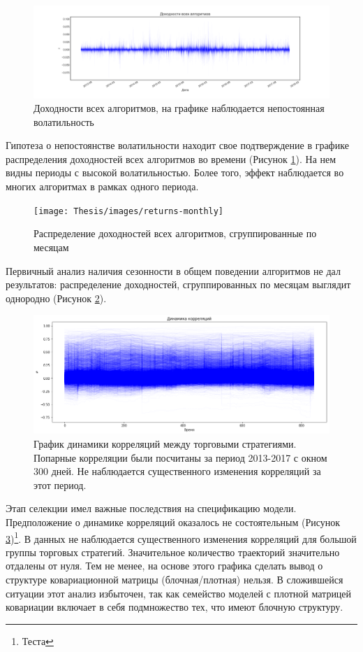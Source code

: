 \begin{figure}[h]
	\centering
	\includegraphics[width=\linewidth]{Thesis/images/returns-all}
	\caption{Доходности всех алгоритмов, на графике наблюдается непостоянная волатильность}
	\label{fig:allreturns}
\end{figure}

Гипотеза о непостоянстве волатильности находит свое подтверждение в графике распределения доходностей всех алгоритмов во времени (Рисунок \ref{fig:allreturns}). На нем видны периоды с высокой волатильностью. Более того, эффект наблюдается во многих алгоритмах в рамках одного периода.	

\begin{figure}
	\centering
	\texttt{[image: Thesis/images/returns-monthly]}
	\caption{Распределение доходностей всех алгоритмов, сгруппированные по месяцам}
	\label{fig:monthlyreturns}
\end{figure}

Первичный анализ наличия сезонности в общем поведении алгоритмов не дал результатов: распределение доходностей, сгруппированных по месяцам выглядит однородно (Рисунок \ref{fig:monthlyreturns}).

\begin{figure}[h]
	\centering
	\includegraphics[width=\linewidth]{Thesis/images/correlations}
	\caption{График динамики корреляций между торговыми стратегиями. Попарные корреляции были посчитаны за период 2013-2017 с окном 300 дней. Не наблюдается существенного изменения корреляций за этот период.}
	\label{fig:correlations}
\end{figure}
Этап селекции имел важные последствия на спецификацию модели. Предположение о динамике корреляций оказалось не состоятельным (Рисунок \ref{fig:correlations})\footnote{Теста}. В данных не наблюдается существенного изменения корреляций для большой группы торговых стратегий. Значительное количество траекторий значительно отдалены от нуля. Тем не менее, на основе этого графика сделать вывод о структуре ковариационной матрицы (блочная/плотная) нельзя. В сложившейся ситуации этот анализ избыточен, так как семейство моделей с плотной матрицей ковариации включает в себя подмножество тех, что имеют блочную структуру. 


